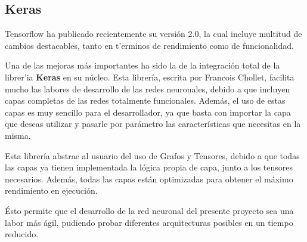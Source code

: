 
\subsection{Keras}
Tensorflow ha publicado recientemente su versión 2.0, la cual incluye multitud de cambios destacables, tanto en t'erminos de rendimiento como de funcionalidad.

Una de las mejoras más importantes ha sido la de la integración total de la librer'ia \textbf{Keras} en su núcleo. Esta librería, escrita por Francois Chollet, facilita mucho las labores de desarrollo de las redes neuronales, debido a que incluyen capas completas de las redes totalmente funcionales. Además, el uso de estas capas es muy sencillo para el desarrollador, ya que basta con importar la capa que deseas utilizar y pasarle por parámetro las características que necesitas en la misma.


Esta librería abstrae al usuario del uso de Grafos y Tensores, debido a que todas las capas ya tienen implementada la lógica propia de capa, junto a los tensores necesarios. Además, todas las capas están optimizadas para obtener el máximo rendimiento en ejecución.

Ésto permite que el desarrollo de la red neuronal del presente proyecto sea una labor más ágil, pudiendo probar diferentes arquitecturas posibles en un tiempo reducido.



\clearpage